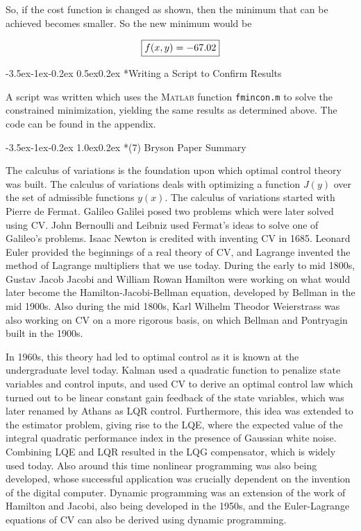 \documentclass[11pt,letterpaper,onecolumn,notitlepage]{article}
\makeatletter
\renewcommand\section{\@startsection{section}{1}{\z@}%
{-3.5ex\@plus-1ex\@minus-0.2ex}%
{1.0ex\@plus0.2ex}%
{\fontsize{12pt}{12pt}\selectfont\bfseries\sffamily}}
\renewcommand\subsection{\@startsection{subsection}{1}{\z@}%
{-3.5ex\@plus-1ex\@minus-0.2ex}%
{0.5ex\@plus0.2ex}%
{\fontsize{10pt}{10pt}\selectfont\bfseries\sffamily}}
\makeatother
\begin{document}
  So, if the cost function is changed as shown, then the minimum that can be achieved becomes smaller.
  So the new minimum would be

  \begin{equation*}
    \boxed{%
    f(x,y)=-67.02}
  \end{equation*}

  \subsection*{Writing a Script to Confirm Results}

  A script was written which uses the \textsc{Matlab} function \texttt{fmincon.m} to solve the constrained minimization, yielding the same results as determined above.
  The code can be found in the appendix.

  \section*{(7) Bryson Paper Summary}

  The calculus of variations is the foundation upon which optimal control theory was built.
  The calculus of variations deals with optimizing a function $J(y)$ over the set of admissible functions $y(x)$.
  The calculus of variations started with Pierre de Fermat.
  Galileo Galilei posed two problems which were later solved using CV.%
  John Bernoulli and Leibniz used Fermat's ideas to solve one of Galileo's problems.
  Isaac Newton is credited with inventing CV in 1685.
  Leonard Euler provided the beginnings of a real theory of CV, and Lagrange invented the method of Lagrange multipliers that we use today.
  During the early to mid 1800s, Gustav Jacob Jacobi and William Rowan Hamilton were working on what would later become the Hamilton-Jacobi-Bellman equation, developed by Bellman in the mid 1900s.
  Also during the mid 1800s, Karl Wilhelm Theodor Weierstrass was also working on CV on a more rigorous basis, on which Bellman and Pontryagin built in the 1900s.

  In 1960s, this theory had led to optimal control as it is known at the undergraduate level today.
  Kalman used a quadratic function to penalize state variables and control inputs, and used CV to derive an optimal control law which turned out to be linear constant gain feedback of the state variables, which was later renamed by Athans as LQR control.
  Furthermore, this idea was extended to the estimator problem, giving rise to the LQE, where the expected value of the integral quadratic performance index in the presence of Gaussian white noise.
  Combining LQE and LQR resulted in the LQG compensator, which is widely used today.
  Also around this time nonlinear programming was also being developed, whose successful application was crucially dependent on the invention of the digital computer.
  Dynamic programming was an extension of the work of Hamilton and Jacobi, also being developed in the 1950s, and the Euler-Lagrange equations of CV can also be derived using dynamic programming.
\end{document}
